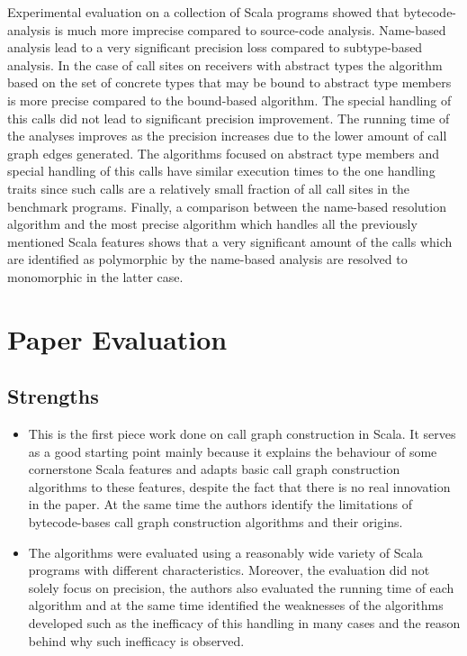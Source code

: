 \documentclass{article} \usepackage{hyperref} \usepackage{graphicx}
\begin{document}
Experimental evaluation on a collection of Scala programs showed that
bytecode-analysis is much more imprecise compared to source-code
analysis. Name-based analysis lead to a very significant precision
loss compared to subtype-based analysis. In the case of call sites on
receivers with abstract types the algorithm based on the set of
concrete types that may be bound to abstract type members is more
precise compared to the bound-based algorithm. The special handling of
this calls did not lead to significant precision improvement. The
running time of the analyses improves as the precision increases due
to the lower amount of call graph edges generated. The algorithms
focused on abstract type members and special handling of this calls
have similar execution times to the one handling traits since such
calls are a relatively small fraction of all call sites in the
benchmark programs. Finally, a comparison between the name-based
resolution algorithm and the most precise algorithm which handles all
the previously mentioned Scala features shows that a very significant
amount of the calls which are identified as polymorphic by the
name-based analysis are resolved to monomorphic in the latter case.

\section{Paper Evaluation}
\subsection{Strengths}
\begin{itemize}
\item This is the first piece work done on call graph construction in
Scala. It serves as a good starting point mainly because it explains
the behaviour of some cornerstone Scala features and adapts basic call
graph construction algorithms to these features, despite the fact that
there is no real innovation in the paper. At the same time the authors
identify the limitations of bytecode-bases call graph construction
algorithms and their origins.
\item The algorithms were evaluated using a reasonably wide variety of
Scala programs with different characteristics. Moreover, the
evaluation did not solely focus on precision, the authors also
evaluated the running time of each algorithm and at the same time
identified the weaknesses of the algorithms developed such as the
inefficacy of this handling in many cases and the reason behind why
such inefficacy is observed.
\end{itemize}
\end{document}
